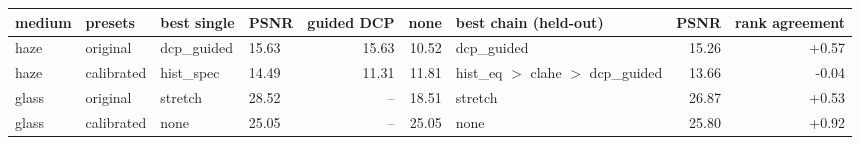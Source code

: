 \begin{tabular}{llllrrlrr}
\toprule
medium & presets & best single & PSNR & guided DCP & none & best chain (held-out) & PSNR & rank agreement \\
\midrule
haze & original & dcp\_guided & 15.63 & 15.63 & 10.52 & dcp\_guided & 15.26 & +0.57 \\
haze & calibrated & hist\_spec & 14.49 & 11.31 & 11.81 & hist\_eq $>$ clahe $>$ dcp\_guided & 13.66 & -0.04 \\
glass & original & stretch & 28.52 & -- & 18.51 & stretch & 26.87 & +0.53 \\
glass & calibrated & none & 25.05 & -- & 25.05 & none & 25.80 & +0.92 \\
\bottomrule
\end{tabular}
